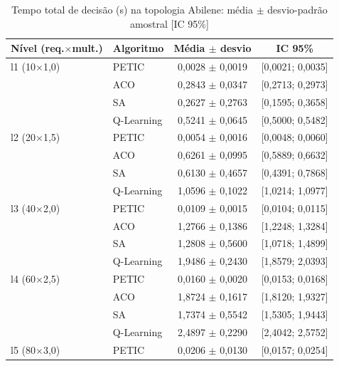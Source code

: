 \begin{table}[htb]
    \centering
    \small
    \caption{Tempo total de decisão (s) na topologia Abilene: média $\pm$ desvio-padrão amostral [IC 95\%]}
    \label{tab:tempo-abilene}
    \begin{tabular}{llcc}
        \hline
        Nível (req.$\times$mult.) & Algoritmo & Média $\pm$ desvio & IC 95\% \\
        \hline
        l1 (10$\times$1,0) & PETIC & 0,0028 $\pm$ 0,0019 & [0,0021; 0,0035] \\
         & ACO & 0,2843 $\pm$ 0,0347 & [0,2713; 0,2973] \\
         & SA & 0,2627 $\pm$ 0,2763 & [0,1595; 0,3658] \\
         & Q-Learning & 0,5241 $\pm$ 0,0645 & [0,5000; 0,5482] \\
        \hline
        l2 (20$\times$1,5) & PETIC & 0,0054 $\pm$ 0,0016 & [0,0048; 0,0060] \\
         & ACO & 0,6261 $\pm$ 0,0995 & [0,5889; 0,6632] \\
         & SA & 0,6130 $\pm$ 0,4657 & [0,4391; 0,7868] \\
         & Q-Learning & 1,0596 $\pm$ 0,1022 & [1,0214; 1,0977] \\
        \hline
        l3 (40$\times$2,0) & PETIC & 0,0109 $\pm$ 0,0015 & [0,0104; 0,0115] \\
         & ACO & 1,2766 $\pm$ 0,1386 & [1,2248; 1,3284] \\
         & SA & 1,2808 $\pm$ 0,5600 & [1,0718; 1,4899] \\
         & Q-Learning & 1,9486 $\pm$ 0,2430 & [1,8579; 2,0393] \\
        \hline
        l4 (60$\times$2,5) & PETIC & 0,0160 $\pm$ 0,0020 & [0,0153; 0,0168] \\
         & ACO & 1,8724 $\pm$ 0,1617 & [1,8120; 1,9327] \\
         & SA & 1,7374 $\pm$ 0,5542 & [1,5305; 1,9443] \\
         & Q-Learning & 2,4897 $\pm$ 0,2290 & [2,4042; 2,5752] \\
        \hline
        l5 (80$\times$3,0) & PETIC & 0,0206 $\pm$ 0,0130 & [0,0157; 0,0254] \\

\end{tabular}
\end{table}
